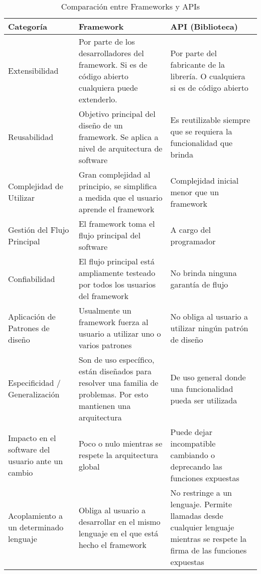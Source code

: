 \begin{table}
	\renewcommand{\arraystretch}{1.5}
	\centering
	\begin{tabularx}{\textwidth}{ | p{2cm} | X | X | }
	\hline
	Categoría & Framework & API (Biblioteca) \\[10pt] \hline
	Extensibilidad & Por parte de los desarrolladores del framework. Si es de
	código abierto cualquiera puede extenderlo. & Por parte del fabricante de la
	librería.
	O cualquiera si es de código abierto \\[10pt] \hline
	Reusabilidad & Objetivo principal del diseño de un framework.
	Se aplica a nivel de arquitectura de software & Es reutilizable siempre que se
	requiera la funcionalidad que brinda\\[10pt] \hline
	Complejidad de Utilizar & Gran complejidad al principio, se simplifica a medida
	que el usuario aprende el framework & Complejidad inicial menor que un
	framework\\[10pt] \hline 
	Gestión del Flujo Principal & El framework toma el
	flujo principal del software & A cargo del programador\\[10pt] \hline
	Confiabilidad & El flujo principal está ampliamente testeado por todos los
	usuarios del framework & No brinda ninguna garantía de flujo\\[10pt] \hline
	Aplicación de Patrones de diseño & Usualmente un framework fuerza al usuario a
	utilizar uno o varios patrones & No obliga al usuario a utilizar ningún patrón
	de diseño\\[10pt] \hline 
	Especificidad / Generalización & Son de uso específico,
	están diseñados para resolver una familia de problemas. Por esto mantienen una
	arquitectura & De uso general donde una funcionalidad pueda ser
	utilizada\\[10pt] \hline 
	Impacto en el software del usuario ante un cambio &
	Poco o nulo mientras se respete la arquitectura global & Puede dejar
	incompatible cambiando o deprecando las funciones expuestas\\[10pt] \hline
	Acoplamiento a un determinado lenguaje & Obliga al usuario a desarrollar en el
	mismo lenguaje en el que está hecho el framework & No restringe a un lenguaje.
	Permite llamadas desde cualquier lenguaje mientras se respete la firma de las funciones expuestas\\[10pt] 
	\hline
	\end{tabularx}
	\caption{Comparación entre Frameworks y APIs}
\end{table}

